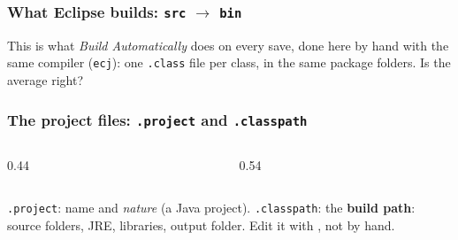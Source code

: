 \documentclass[aspectratio=169,10pt,compress]{beamer}
\begin{document}
\begin{frame}[t,fragile] \frametitle{What Eclipse builds: \texttt{src} $\to$ \texttt{bin}}

  \vspace{0.1em}
  \small
  This is what \emph{Build Automatically} does on every save, done here by hand with the same compiler (\texttt{ecj}):
  one \texttt{.class} file per class, in the same package folders. Is the average right?
\end{frame}




\begin{frame}[t,fragile] \frametitle{The project files: \texttt{.project} and \texttt{.classpath}}
  \begin{columns}[T]
    \begin{column}{0.44\textwidth}
    \end{column}
    \begin{column}{0.54\textwidth}
    \end{column}
  \end{columns}
  \small \texttt{.project}: name and \emph{nature} (a Java project). \texttt{.classpath}: the \textbf{build path}: source folders,
  JRE, libraries, output folder. Edit it with , not by hand.
\end{frame}
\end{document}
